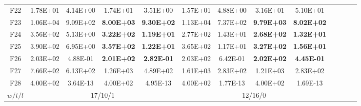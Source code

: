 \begin{table*}[!ht]
\begin{tabular}{|c|cc|cc|cc|cc|cc|cc|}
    F22   & 1.78E+01 & 4.14E+00 & 1.74E+01 & 3.51E+00 & 1.57E+01 & 4.88E+00 & 3.16E+01 & 5.10E+01 \\
    F23   & 1.06E+04 & 9.09E+02 & \textbf{8.00E+03} & \textbf{9.30E+02} & 1.13E+04 & 7.37E+02 & \textbf{9.79E+03} & \textbf{8.02E+02} \\
    F24   & 3.56E+02 & 5.13E+00 & \textbf{3.22E+02} & \textbf{1.19E+01} & 2.77E+02 & 1.43E+01 & \textbf{2.68E+02} & \textbf{1.32E+01} \\
    F25   & 3.90E+02 & 6.95E+00 & \textbf{3.57E+02} & \textbf{1.22E+01} & 3.65E+02 & 1.17E+01 & \textbf{3.27E+02} & \textbf{1.56E+01} \\
    F26   & 2.03E+02 & 4.88E-01 & \textbf{2.01E+02} & \textbf{2.82E-01} & 2.03E+02 & 6.42E-01 & \textbf{2.02E+02} & \textbf{4.45E-01} \\
    F27   & 7.66E+02 & 6.13E+02 & 1.26E+03 & 4.89E+02 & 1.61E+03 & 2.83E+02 & 1.21E+03 & 2.83E+02 \\
    F28   & 4.00E+02 & 3.64E-13 & 4.00E+02 & 4.95E-13 & 4.00E+02 & 1.77E-13 & 4.00E+02 & 1.69E-13 \\
    \cline{1-9}
    $w/t/l$ & \multicolumn{4}{c|}{17/10/1}   & \multicolumn{4}{c|}{12/16/0} \\
    \cline{1-9}
    \end{tabular}%
  \label{tab:AG_CEC13_advanced50D}%
\end{table*}%

